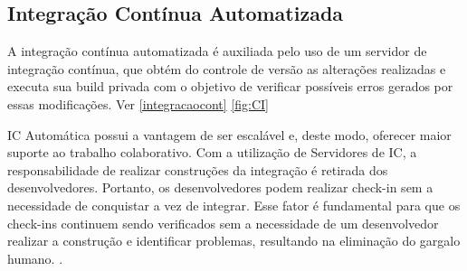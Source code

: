 \subsection{Integração Contínua Automatizada}
A integração contínua automatizada é auxiliada pelo uso de um servidor de integração contínua, que obtém do controle de versão as alterações realizadas e executa sua build privada com o objetivo de verificar possíveis erros gerados por essas modificações. Ver \autoref{integracaocont} \autoref{fig:CI} 
\begin{citacao}
IC Automática possui a vantagem de ser escalável 
e,  deste  modo,  oferecer  maior  suporte  ao  trabalho  colaborativo.  Com  a  utilização  de 
Servidores  de  IC,  a  responsabilidade  de  realizar  construções  da  integração  é  retirada  dos desenvolvedores. Portanto, os desenvolvedores podem realizar  check-in  sem a necessidade de 
conquistar a vez de integrar. Esse fator é fundamental para que os  check-ins  continuem sendo 
verificados  sem  a  necessidade  de  um desenvolvedor  realizar  a  construção  e identificar 
problemas, resultando na eliminação do gargalo humano. . 
\end{citacao}


